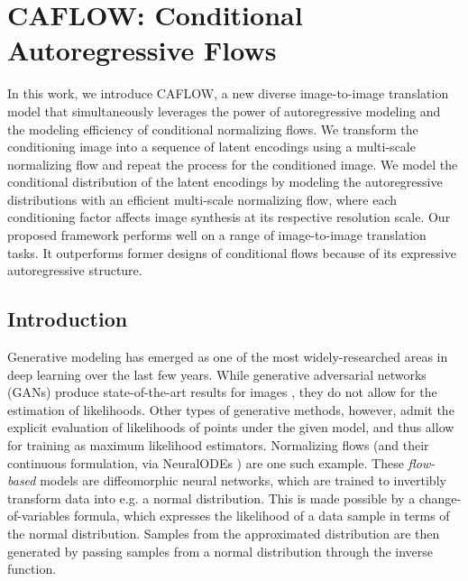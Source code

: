 
\chapter{CAFLOW: Conditional Autoregressive Flows} \label{Chapter:CAFLOW}  %

\ifpdf
    \graphicspath{{Chapter1/Figs/Raster/}{Chapter1/Figs/PDF/}{Chapter1/Figs/}}
\else
    \graphicspath{{Chapter1/Figs/Vector/}{Chapter1/Figs/}}
\fi

In this work, we introduce CAFLOW, a new diverse image-to-image translation model that simultaneously leverages the power of autoregressive modeling and the modeling efficiency of conditional normalizing flows. We transform the conditioning image into a sequence of latent encodings using a multi-scale normalizing flow and repeat the process for the conditioned image. We model the conditional distribution of the latent encodings by modeling the autoregressive distributions with an efficient multi-scale normalizing flow, where each conditioning factor affects image synthesis at its respective resolution scale. Our proposed framework performs well on a range of image-to-image translation tasks. It outperforms former designs of conditional flows because of its expressive autoregressive structure.

\section{Introduction}

Generative modeling has emerged as one of the most widely-researched areas in deep learning over the last few years. While generative adversarial networks (GANs) \cite{GANs} produce state-of-the-art results for images \cite{viazovetskyi2020stylegan2}, they do not allow for the estimation of likelihoods. Other types of generative methods, however, admit the explicit evaluation of likelihoods of points under the given model, and thus allow for training as maximum likelihood estimators. Normalizing flows \cite{rezende2015variational} (and their continuous formulation, via NeuralODEs \cite{neuralODEs}) are one such example. These \emph{flow-based} models are diffeomorphic neural networks, which are trained to invertibly transform data into e.g. a normal distribution. This is made possible by a change-of-variables formula, which expresses the likelihood of a data sample in terms of the normal distribution. Samples from the approximated distribution are then generated by passing samples from a normal distribution through the inverse function.


